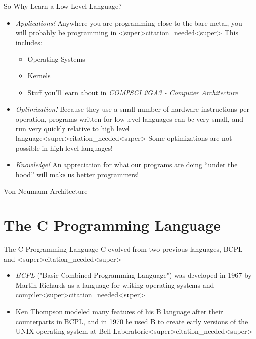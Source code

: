 \documentclass[11pt]{beamer}
\begin{document}
\begin{frame}{So Why Learn a Low Level Language?}
\begin{itemize}
\item \textit{Applications!} Anywhere you are programming close to the bare metal, you will probably be programming in <super>citation_needed<super>  This includes:
\begin{itemize}
\item Operating Systems 
\item Kernels
\item Stuff you'll learn about in \emph{COMPSCI 2GA3 - Computer Architecture}
\end{itemize}
\item \textit{Optimization!} Because they use a small number of hardware instructions per operation, programs written for low level languages can be very small, and run very quickly relative to high level language<super>citation_needed<super>  Some optimizations are not possible in high level languages! 
\item \textit{Knowledge!}  An appreciation for what our programs are doing ``under the hood'' will make us better programmers!  
\end{itemize}
\end{frame}

\begin{frame}{Von Neumann Architecture}
\center
\
\end{frame}

\section[C]{The C Programming Language}


\begin{frame}{The C Programming Language}
C evolved from two previous languages, BCPL and <super>citation_needed<super>
\begin{itemize}
\item \textit{BCPL} ("Basic Combined Programming Language") was developed in 1967 by Martin Richards as a language for writing operating-systems and compiler<super>citation_needed<super>
\item Ken Thompson modeled many features of his B language after their counterparts in BCPL, and in 1970 he used B to create early versions of the UNIX operating system at Bell Laboratorie<super>citation_needed<super>
\end{itemize}
\end{frame}
\end{document}
